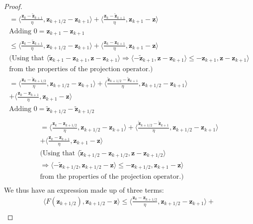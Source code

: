 \begin{proof}
\begin{align*}
    = \Bigg \langle\frac{\bm{z}_k-\tilde{\bm{z}}_{k+1}}{\eta}, \bm{z}_{k+1/2} - \bm{z}_{k+1} \Bigg\rangle +
    \Bigg \langle\frac{\bm{z}_k-\tilde{\bm{z}}_{k+1}}{\eta}, \bm{z}_{k+1} -\bm{z} \Bigg\rangle \\ \text{Adding $0=\bm{z}_{k+1}-\textbf{z}_{k+1}$} \\
    \leq \Bigg \langle\frac{\bm{z}_k-\tilde{\bm{z}}_{k+1}}{\eta}, \bm{z}_{k+1/2} -\bm{z}_{k+1} \Bigg\rangle +
    \Bigg \langle\frac{\bm{z}_k-{\bm{z}}_{k+1}}{\eta}, \bm{z}_{k+1} -\bm{z} \Bigg\rangle \\  
    \text{(Using that }
    \langle \tilde{\bm{z}}_{k+1} - {\bm{z}}_{k+1}, \bm{z} -\bm{z}_{k+1} \rangle \Rightarrow 
    \langle - \tilde{\bm{z}}_{k+1} , \bm{z} -\bm{z}_{k+1} \rangle \leq - {\bm{z}}_{k+1}, \bm{z} -\bm{z}_{k+1} \rangle\\
    \text{from the properties of the projection operator.)} \\
    = \Bigg \langle\frac{\bm{z}_k-\tilde{\bm{z}}_{k+1/2}}{\eta}, \bm{z}_{k+1/2} -\bm{z}_{k+1} \Bigg\rangle +
    \Bigg \langle\frac{\tilde{\bm{z}}_{k+1/2}-\tilde{\bm{z}}_{k+1}}{\eta}, \bm{z}_{k+1/2} -\bm{z}_{k+1} \Bigg\rangle \\+ 
    \Bigg \langle\frac{\bm{z}_k-{\bm{z}}_{k+1}}{\eta}, \bm{z}_{k+1} -\bm{z} \Bigg\rangle \\  
    \text{Adding $0=\tilde{\bm{z}}_{k+1/2}-\tilde{\bm{z}}_{k+1/2}$} \\
\end{align*}
\begin{align*}
    = \Bigg \langle\frac{\bm{z}_k-{\bm{z}}_{k+1/2}}{\eta}, \bm{z}_{k+1/2} -\bm{z}_{k+1} \Bigg\rangle +
    \Bigg \langle\frac{\tilde{\bm{z}}_{k+1/2}-\tilde{\bm{z}}_{k+1}}{\eta}, \bm{z}_{k+1/2} -\bm{z}_{k+1} \Bigg\rangle \\+ 
    \Bigg \langle\frac{\bm{z}_k-{\bm{z}}_{k+1}}{\eta}, \bm{z}_{k+1} -\bm{z} \Bigg\rangle \\  
    \text{(Using that }
    \langle \tilde{\bm{z}}_{k+1/2} - {\bm{z}}_{k+1/2}, \bm{z} -\bm{z}_{k+1/2} \rangle \\\Rightarrow 
    \langle - \tilde{\bm{z}}_{k+1/2} , \bm{z}_{k+1/2} -\bm{z} \rangle \leq - {\bm{z}}_{k+1/2}, \bm{z}_{k+1} -\bm{z} \rangle\\
    \text{from the properties of the projection operator.)} \\
\end{align*}
We thus have an expression made up of three terms:
\begin{align*}
    \langle F(\bm{z}_{k+1/2}), \bm{z}_{k+1/2} -\bm{z} \rangle \leq \Bigg \langle\frac{\bm{z}_k-{\bm{z}}_{k+1/2}}{\eta}, \bm{z}_{k+1/2} -\bm{z}_{k+1} \Bigg\rangle + \\

\end{align*}
\end{proof}
